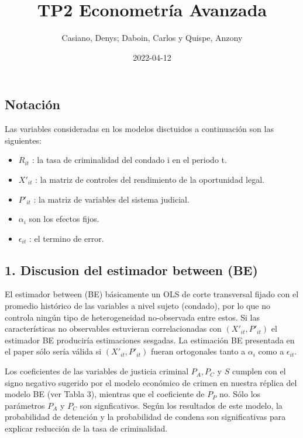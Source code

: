 \documentclass[
]{article}
\title{TP2 Econometría Avanzada}
\author{Casiano, Denys; Daboin, Carlos y Quispe, Anzony}
\date{2022-04-12}
\providecommand{\tightlist}{%
  \setlength{\itemsep}{0pt}\setlength{\parskip}{0pt}}
\begin{document}
\maketitle

\hypertarget{notaciuxf3n}{%
\subsection{Notación}\label{notaciuxf3n}}

Las variables consideradas en los modelos disctuidos a continuación son
las siguientes:

\begin{itemize}
\tightlist
\item
  \(R_{it}\) : la tasa de criminalidad del condado i en el periodo t.
\item
  \(X'_{it}\) : la matriz de controles del rendimiento de la oportunidad
  legal.
\item
  \(P'_{it}\) : la matriz de variables del sistema judicial.
\item
  \(\alpha_{i}\) son los efectos fijos.
\item
  \(\epsilon_{it}\) : el termino de error.
\end{itemize}

\hypertarget{discusion-del-estimador-between-be}{%
\subsection{1. Discusion del estimador between
(BE)}\label{discusion-del-estimador-between-be}}

El estimador between (BE) básicamente un OLS de corte transversal fijado
con el promedio histórico de las variables a nivel sujeto (condado), por
lo que no controla ningún tipo de heterogeneidad no-observada entre
estos. Si las características no observables estuvieran correlacionadas
con \((X'_{it},P'_{it})\) el estimador BE produciría estimaciones
sesgadas. La estimación BE presentada en el paper sólo sería válida si
\((X'_{it},P'_{it})\) fueran ortogonales tanto a \(\alpha_i\) como a
\(\epsilon_{it}\).

Los coeficientes de las variables de justicia criminal \(P_A, P_C\) y
\(S\) cumplen con el signo negativo sugerido por el modelo económico de
crimen en nuestra réplica del modelo BE (ver Tabla 3), mientras que el
coeficiente de \(P_P\) no. Sólo los parámetros \(P_A\) y \(P_C\) son
signficativos. Según los resultados de este modelo, la probabilidad de
detención y la probabilidad de condena son significativas para explicar
reducción de la tasa de criminalidad.
\end{document}
